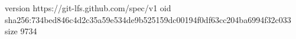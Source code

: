 version https://git-lfs.github.com/spec/v1
oid sha256:734bed846c4d2c35a59e534de9b525159dc00194f0df63cc204ba6994f32c033
size 9734
